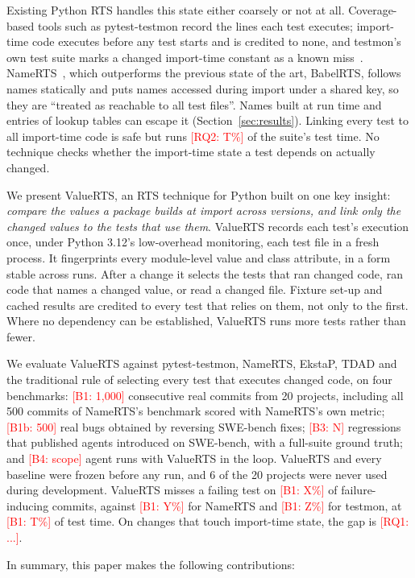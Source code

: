 \documentclass[acmsmall,screen,review,anonymous]{acmart}
\newcommand{\ph}[1]{\textcolor{red}{[#1]}}
\newcommand{\tool}{ValueRTS\xspace}
\begin{document}
Existing Python RTS handles this state either coarsely or not at all. Coverage-based tools such as pytest-testmon record the lines each test executes; import-time code executes before any test starts and is credited to none, and testmon's own test suite marks a changed import-time constant as a known miss~\cite{testmon}. NameRTS~\cite{wang2026namerts}, which outperforms the previous state of the art, BabelRTS, follows names statically and puts names accessed during import under a shared key, so they are ``treated as reachable to all test files''. Names built at run time and entries of lookup tables can escape it (Section~\ref{sec:results}). Linking every test to all import-time code is safe but runs \ph{RQ2: T\%} of the suite's test time. No technique checks whether the import-time state a test depends on actually changed.

We present \tool, an RTS technique for Python built on one key insight: \emph{compare the values a package builds at import across versions, and link only the changed values to the tests that use them}. \tool records each test's execution once, under Python 3.12's low-overhead monitoring, each test file in a fresh process. It fingerprints every module-level value and class attribute, in a form stable across runs. After a change it selects the tests that ran changed code, ran code that names a changed value, or read a changed file. Fixture set-up and cached results are credited to every test that relies on them, not only to the first. Where no dependency can be established, \tool runs more tests rather than fewer.

We evaluate \tool against pytest-testmon, NameRTS, EkstaP, TDAD and the traditional rule of selecting every test that executes changed code, on four benchmarks: \ph{B1: 1,000} consecutive real commits from 20 projects, including all 500 commits of NameRTS's benchmark scored with NameRTS's own metric; \ph{B1b: 500} real bugs obtained by reversing SWE-bench fixes; \ph{B3: N} regressions that published agents introduced on SWE-bench, with a full-suite ground truth; and \ph{B4: scope} agent runs with \tool in the loop. \tool and every baseline were frozen before any run, and 6 of the 20 projects were never used during development. \tool misses a failing test on \ph{B1: X\%} of failure-inducing commits, against \ph{B1: Y\%} for NameRTS and \ph{B1: Z\%} for testmon, at \ph{B1: T\%} of test time. On changes that touch import-time state, the gap is \ph{RQ1: ...}.

In summary, this paper makes the following contributions:
\end{document}
